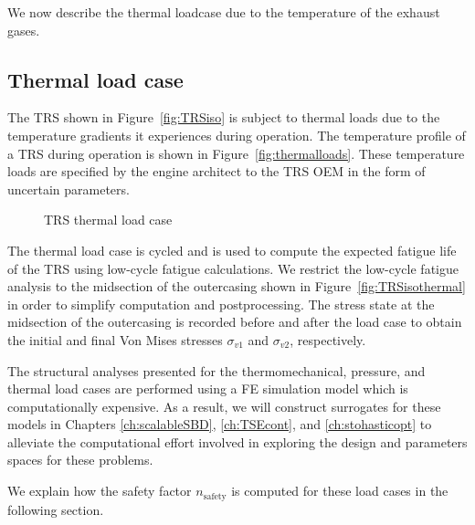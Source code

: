 We now describe the thermal loadcase due to the temperature of the exhaust gases.

\subsection{Thermal load case} \label{subsec:thermalloadcase}

The \ac{TRS} shown in Figure~\ref{fig:TRSiso} is subject to thermal loads due to the temperature gradients it experiences during operation. The temperature profile of a \ac{TRS} during operation is shown in Figure~\ref{fig:thermalloads}. These temperature loads are specified by the engine architect to the \ac{TRS} \ac{OEM} in the form of uncertain parameters.

\begin{figure}[h!]
	\centering
	 \hspace{0.1\textwidth}%
	\caption{\ac{TRS} thermal load case}
	\label{fig:thermalloadcases}
\end{figure}

The thermal load case is cycled and is used to compute the expected fatigue life of the \ac{TRS} using low-cycle fatigue calculations. We restrict the low-cycle fatigue analysis to the midsection of the outercasing shown in Figure~\ref{fig:TRSisothermal} in order to simplify computation and postprocessing. The stress state at the midsection of the outercasing is recorded before and after the load case to obtain the initial and final Von Mises stresses $\sigma_{v1}$ and $\sigma_{v2}$, respectively. 

The structural analyses presented for the thermomechanical, pressure, and thermal load cases are performed using a \ac{FE} simulation model which is computationally expensive. As a result, we will construct surrogates for these models in Chapters \ref{ch:scalableSBD}, \ref{ch:TSEcont}, and \ref{ch:stohasticopt} to alleviate the computational effort involved in exploring the design and parameters spaces for these problems.

We explain how the safety factor $n_{\textrm{safety}}$ is computed for these load cases in the following section.


